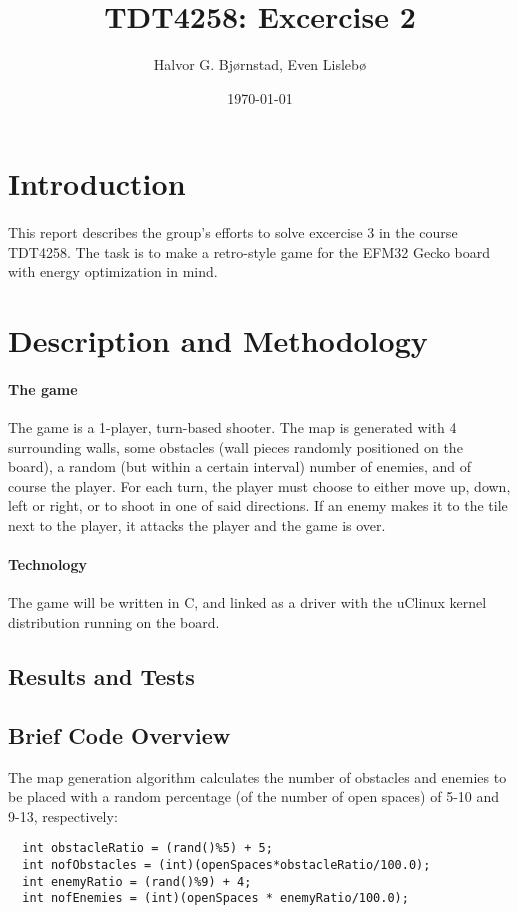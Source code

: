 \documentclass{article}
\title{TDT4258: Excercise 2}
\author{Halvor G. Bjørnstad, Even Lislebø}
\date{\today}
\begin{document}
\maketitle
\section*{Introduction}
\paragraph{}
This report describes the group's efforts to solve excercise 3 in the course TDT4258. The task is to make a retro-style game for the EFM32 Gecko board with energy optimization in mind.

\section*{Description and Methodology}
\paragraph{The game}
The game is a 1-player, turn-based shooter. The map is generated with 4 surrounding walls, some obstacles (wall pieces randomly positioned on the board), a random (but within a certain interval) number of enemies, and of course the player. For each turn, the player must choose to either move up, down, left or right, or to shoot in one of said directions. If an enemy makes it to the tile next to the player, it attacks the player and the game is over.

\paragraph{Technology}
The game will be written in C, and linked as a driver with the uClinux kernel distribution running on the board.

\subsection*{Results and Tests}

\subsection*{Brief Code Overview}
The map generation algorithm calculates the number of obstacles and enemies to be placed with a random percentage (of the number of open spaces) of 5-10 and 9-13, respectively:
\begin{lstlisting}
  int obstacleRatio = (rand()%5) + 5;
  int nofObstacles = (int)(openSpaces*obstacleRatio/100.0);
  int enemyRatio = (rand()%9) + 4;
  int nofEnemies = (int)(openSpaces * enemyRatio/100.0);
\end{lstlisting}
\end{document}
